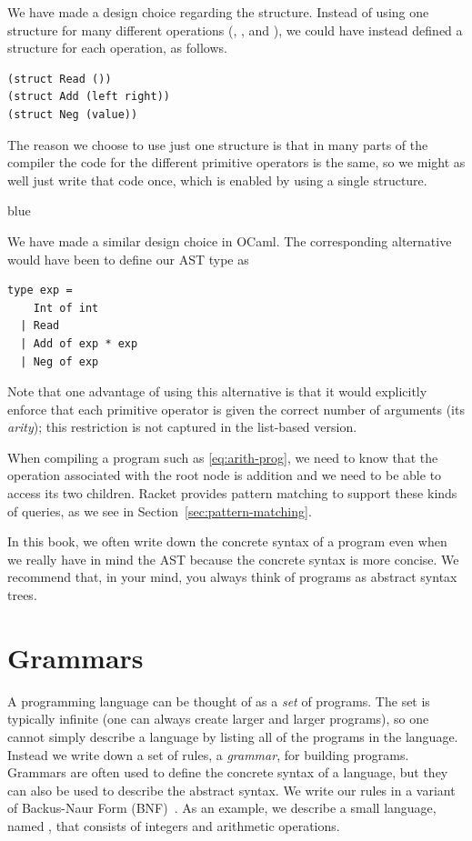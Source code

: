 \documentclass[11pt]{book}
\newcommand{\ocaml}[1]{{\color{blue}{#1}}}
\newenvironment{ocamlx}{
  \begin{color}{blue}
}
{
  \end{color}
}
\begin{document}
We have made a design choice regarding the  structure.
Instead of using one structure for many different operations
(, \code{+}, and \code{-}), we could have instead defined a
structure for each operation, as follows.
\begin{lstlisting}
(struct Read ())
(struct Add (left right))
(struct Neg (value))
\end{lstlisting}
The reason we choose to use just one structure is that in many parts
of the compiler the code for the different primitive operators is the
same, so we might as well just write that code once, which is enabled
by using a single structure.

\begin{ocamlx}
  We have made a similar design choice in OCaml. The corresponding
  alternative would have been to define our AST type as
\begin{lstlisting}[style=ocaml]
type exp = 
    Int of int  
  | Read
  | Add of exp * exp
  | Neg of exp
\end{lstlisting}
Note that one advantage of using this alternative is that it would explicitly enforce
that each primitive operator is given the correct number of arguments (its \emph{arity});
this restriction is not captured in the list-based version.
\end{ocamlx}

When compiling a program such as \eqref{eq:arith-prog}, we need to
know that the operation associated with the root node is addition and
we need to be able to access its two children. Racket provides pattern
matching to support these kinds of queries, as we see in
Section~\ref{sec:pattern-matching}. \ocaml{So does OCaml.}

In this book, we often write down the concrete syntax of a program
even when we really have in mind the AST because the concrete syntax
is more concise.  We recommend that, in your mind, you always think of
programs as abstract syntax trees.

\section{Grammars}
\label{sec:grammar}

A programming language can be thought of as a \emph{set} of programs.
The set is typically infinite (one can always create larger and larger
programs), so one cannot simply describe a language by listing all of
the programs in the language. Instead we write down a set of rules, a
\emph{grammar}, for building programs. Grammars are often used to
define the concrete syntax of a language, but they can also be used to
describe the abstract syntax. We write our rules in a variant of
Backus-Naur Form (BNF)~\citep{Backus:1960aa,Knuth:1964aa}.
As an example, we describe a small language, named \LangInt{}, that consists of
integers and arithmetic operations.
\end{document}
